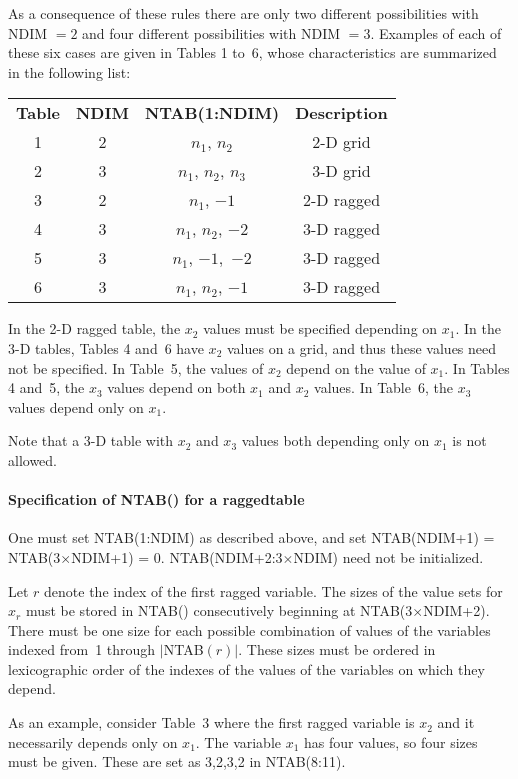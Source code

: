 \documentclass[twoside]{MATH77}
\begin{document}
As a consequence of these rules there are only two different possibilities
with NDIM $= 2$ and four different possibilities with NDIM $= 3$. Examples
of each of these six cases are given in Tables 1 to~6, whose characteristics
are summarized in the following list:

\begin{tabular}{@{}cccc@{}}
\bf Table & \bf NDIM & \bf NTAB(1:NDIM) & \bf Description\\
   1 & 2 & $n_1$, $n_2$ & 2-D grid\\
   2 & 3 & $n_1$, $n_2$, $n_3$ & 3-D grid\\
   3 & 2 & $n_1$, $-1$ & 2-D ragged\\
   4 & 3 & $n_1$, $n_2$, $-2$ & 3-D ragged\\
   5 & 3 & $n_1$, $-1,$ $-2$ & 3-D ragged\\
   6 & 3 & $n_1$, $n_2$, $-1$ & 3-D ragged\\
\end{tabular}

In the 2-D ragged table, the $x_2$ values must be specified depending on $%
x_1 $. In the 3-D tables, Tables 4 and~6 have $x_2$ values on a grid, and
thus these values need not be specified. In Table~5, the values of $x_2$
depend on the value of $x_1$. In Tables 4 and~5, the $x_3$ values depend on
both $x_1$ and $x_2$ values. In Table~6, the $x_3$ values depend only on $x_1
$.

Note that a 3-D table with $x_2$ and $x_3$ values both depending only on $%
x_1 $ is not allowed.

\paragraph{Specification of NTAB() for a ragged\newline table}

One must set NTAB(1:NDIM) as described above, and set NTAB(NDIM+1) =
NTAB(3$\times $NDIM+1) = 0. NTAB(NDIM+2:3$\times $NDIM) need not be
initialized.

Let $r$ denote the index of the first ragged variable. The sizes of the
value sets for $x_r$ must be stored in NTAB() consecutively beginning at
NTAB(3$\times $NDIM+2). There must be one size for each possible combination
of values of the variables indexed from~1 through $|$NTAB$(r)|$. These sizes
must be ordered in lexicographic order of the indexes of the values of the
variables on which they depend.

As an example, consider Table~3 where the first ragged variable is $x_2$ and
it necessarily depends only on $x_1$. The variable $x_1$ has four values, so
four sizes must be given. These are set as 3,2,3,2 in NTAB(8:11).
\end{document}
